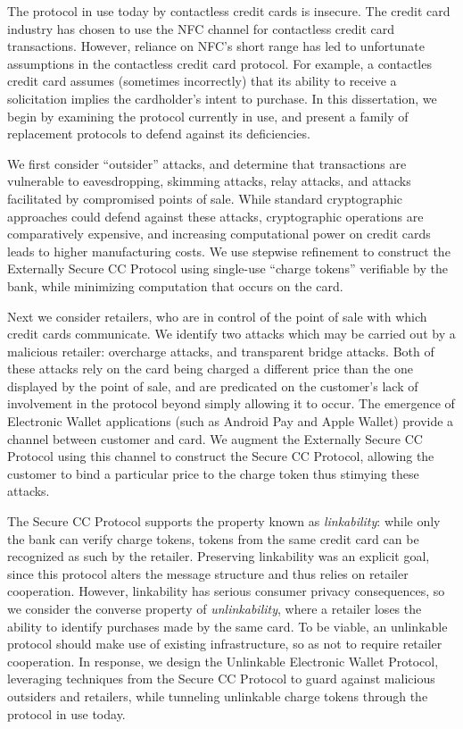 The protocol in use today by contactless credit cards is insecure.
The credit card industry has chosen to use the NFC channel for contactless credit card transactions.
However, reliance on NFC's short range has led to unfortunate assumptions in the contactless credit card protocol.
For example, a contactles credit card assumes (sometimes incorrectly) that its ability to receive a solicitation implies the cardholder's intent to purchase.
In this dissertation, we begin by examining the protocol currently in use,
    and present a family of replacement protocols to defend against its deficiencies.

We first consider ``outsider'' attacks, and determine that transactions are vulnerable to
    eavesdropping, skimming attacks, relay attacks, and attacks facilitated by compromised points of sale.
While standard cryptographic approaches could defend against these attacks,
    cryptographic operations are comparatively expensive, and increasing computational power on credit cards leads to higher manufacturing costs.
We use stepwise refinement to construct the Externally Secure CC Protocol using single-use ``charge tokens'' verifiable by the bank,
    while minimizing computation that occurs on the card.

Next we consider retailers, who are in control of the point of sale with which credit cards communicate.
We identify two attacks which may be carried out by a malicious retailer:
    overcharge attacks, and transparent bridge attacks.
Both of these attacks rely on the card being charged a different price than the one displayed by the point of sale,
    and are predicated on the customer's lack of involvement in the protocol beyond simply allowing it to occur.
The emergence of Electronic Wallet applications (such as Android Pay and Apple Wallet) provide a channel between customer and card.
We augment the Externally Secure CC Protocol using this channel to construct the Secure CC Protocol,
    allowing the customer to bind a particular price to the charge token thus stimying these attacks.

The Secure CC Protocol supports the property known as \emph{linkability}:
    while only the bank can verify charge tokens, tokens from the same credit card can be recognized as such by the retailer.
Preserving linkability was an explicit goal, since this protocol alters the message structure and thus relies on retailer cooperation.
However, linkability has serious consumer privacy consequences, so we consider the converse property of
    \emph{unlinkability}, where a retailer loses the ability to identify purchases made by the same card.
To be viable, an unlinkable protocol should make use of existing infrastructure, so as not to require retailer cooperation.
In response, we design the Unlinkable Electronic Wallet Protocol,
    leveraging techniques from the Secure CC Protocol to guard against malicious outsiders and retailers,
    while tunneling unlinkable charge tokens through the protocol in use today.
